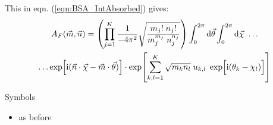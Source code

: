 \documentclass[
	english,
	a4paper,
	fontsize=10pt,
	parskip=half,
	titlepage=true,
	DIV=12,
	final
]{scrreprt}
\newcommand*{\iunit}{\ensuremath{\mathrm{i}}}
\begin{document}
This in eqn. (\ref{eqn:BSA_IntAbsorbed}) gives:
\begin{multline}
	A_F(\vec{m}, \vec{n})
=
	\qty(
		\prod_{j=1}^{K}
		\frac
			{1}
			{-4\pi^{2}}
		\sqrt{\frac
			{m_j!      \; n_j!}
			{m_j^{m_j} \; n_j^{n_j} }
		}
	)
	\int_{0}^{2\pi} \dd{\vec{\theta}}
	\int_{0}^{2\pi} \dd{\vec{\chi}}\ \ldots \\
		\ldots		
		\exp[\iunit (\vec{n} \cdot \vec{\chi}  -  \vec{m} \cdot \vec{\theta})] \cdot 
		\exp[\sum_{k,l=1}^{K} \sqrt{m_k n_l} \; u_{k,l} \; \exp[\Big.\iunit(\theta_k - \chi_l)] ]
\end{multline}

Symbols
\begin{itemize}
\item as before
\end{itemize}
\end{document}
